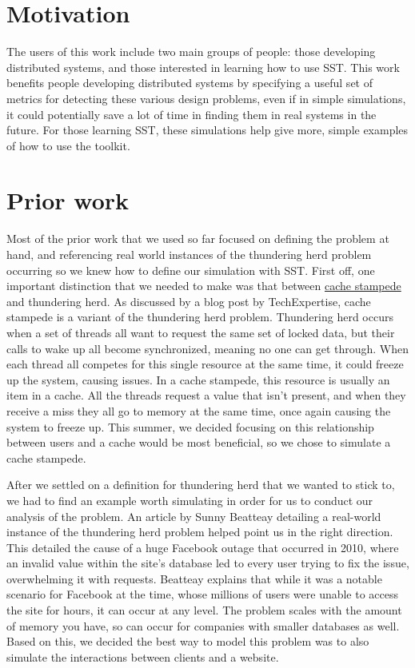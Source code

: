 \documentclass{article}
\begin{document}
\section{Motivation} %

The users of this work include two main groups of people: those developing distributed systems, and those interested in learning how to use SST.  This work benefits people developing distributed systems by specifying a useful set of metrics for detecting these various design problems, even if in simple simulations, it could potentially save a lot of time in finding them in real systems in the future.  For those learning SST, these simulations help give more, simple examples of how to use the toolkit.

\section{Prior work} %

Most of the prior work that we used so far focused on defining the problem at hand, and referencing real world instances of the thundering herd problem occurring so we knew how to define our simulation with SST.  First off, one important distinction that we needed to make was that between \href{https://en.wikipedia.org/wiki/Cache_stampede}{cache stampede} and thundering herd.  As discussed by a blog post by TechExpertise, cache stampede is a variant of the thundering herd problem. \cite{techexpertise}  Thundering herd occurs when a set of threads all want to request the same set of locked data, but their calls to wake up all become synchronized, meaning no one can get through.  When each thread all competes for this single resource at the same time, it could freeze up the system, causing issues.  In a cache stampede, this resource is usually an item in a cache.  All the threads request a value that isn't present, and when they receive a miss they all go to memory at the same time, once again causing the system to freeze up.  This summer, we decided focusing on this relationship between users and a cache would be most beneficial, so we chose to simulate a cache stampede.  

After we settled on a definition for thundering herd that we wanted to stick to, we had to find an example worth simulating in order for us to conduct our analysis of the problem.  An article by Sunny Beatteay detailing a real-world instance of the thundering herd problem helped point us in the right direction.\cite{beatteay}  This detailed the cause of a huge Facebook outage that occurred in 2010, where an invalid value within the site's database led to every user trying to fix the issue, overwhelming it with requests.  Beatteay explains that while it was a notable scenario for Facebook at the time, whose millions of users were unable to access the site for hours, it can occur at any level.  The problem scales with the amount of memory you have, so can occur for companies with smaller databases as well.  Based on this, we decided the best way to model this problem was to also simulate the interactions between clients and a website.
\end{document}
